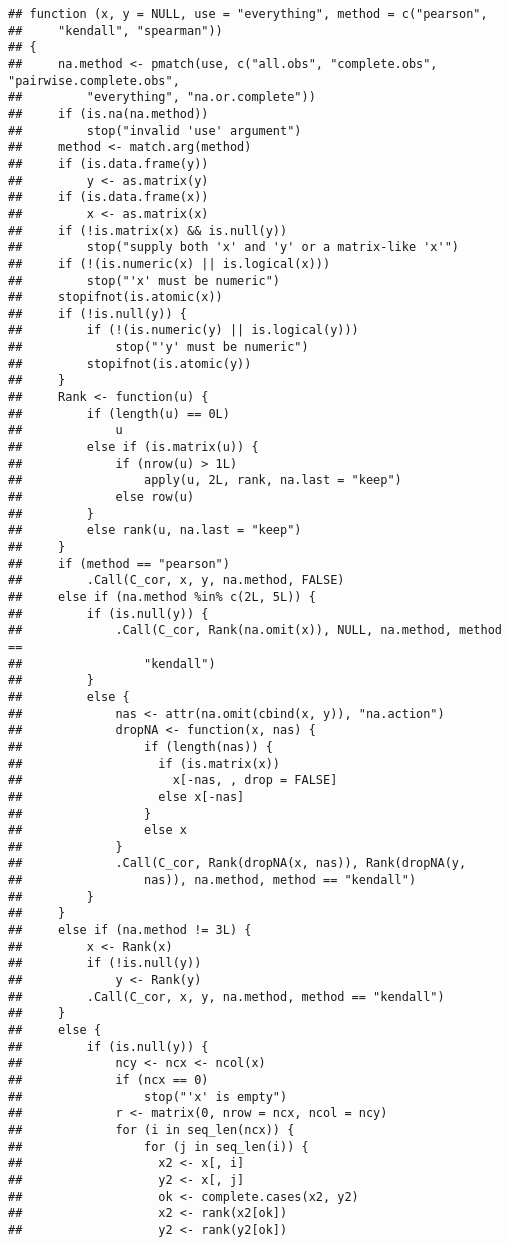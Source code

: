 \documentclass[]{article}
\begin{document}
\begin{verbatim}
## function (x, y = NULL, use = "everything", method = c("pearson", 
##     "kendall", "spearman")) 
## {
##     na.method <- pmatch(use, c("all.obs", "complete.obs", "pairwise.complete.obs", 
##         "everything", "na.or.complete"))
##     if (is.na(na.method)) 
##         stop("invalid 'use' argument")
##     method <- match.arg(method)
##     if (is.data.frame(y)) 
##         y <- as.matrix(y)
##     if (is.data.frame(x)) 
##         x <- as.matrix(x)
##     if (!is.matrix(x) && is.null(y)) 
##         stop("supply both 'x' and 'y' or a matrix-like 'x'")
##     if (!(is.numeric(x) || is.logical(x))) 
##         stop("'x' must be numeric")
##     stopifnot(is.atomic(x))
##     if (!is.null(y)) {
##         if (!(is.numeric(y) || is.logical(y))) 
##             stop("'y' must be numeric")
##         stopifnot(is.atomic(y))
##     }
##     Rank <- function(u) {
##         if (length(u) == 0L) 
##             u
##         else if (is.matrix(u)) {
##             if (nrow(u) > 1L) 
##                 apply(u, 2L, rank, na.last = "keep")
##             else row(u)
##         }
##         else rank(u, na.last = "keep")
##     }
##     if (method == "pearson") 
##         .Call(C_cor, x, y, na.method, FALSE)
##     else if (na.method %in% c(2L, 5L)) {
##         if (is.null(y)) {
##             .Call(C_cor, Rank(na.omit(x)), NULL, na.method, method == 
##                 "kendall")
##         }
##         else {
##             nas <- attr(na.omit(cbind(x, y)), "na.action")
##             dropNA <- function(x, nas) {
##                 if (length(nas)) {
##                   if (is.matrix(x)) 
##                     x[-nas, , drop = FALSE]
##                   else x[-nas]
##                 }
##                 else x
##             }
##             .Call(C_cor, Rank(dropNA(x, nas)), Rank(dropNA(y, 
##                 nas)), na.method, method == "kendall")
##         }
##     }
##     else if (na.method != 3L) {
##         x <- Rank(x)
##         if (!is.null(y)) 
##             y <- Rank(y)
##         .Call(C_cor, x, y, na.method, method == "kendall")
##     }
##     else {
##         if (is.null(y)) {
##             ncy <- ncx <- ncol(x)
##             if (ncx == 0) 
##                 stop("'x' is empty")
##             r <- matrix(0, nrow = ncx, ncol = ncy)
##             for (i in seq_len(ncx)) {
##                 for (j in seq_len(i)) {
##                   x2 <- x[, i]
##                   y2 <- x[, j]
##                   ok <- complete.cases(x2, y2)
##                   x2 <- rank(x2[ok])
##                   y2 <- rank(y2[ok])

\end{verbatim}
\end{document}

